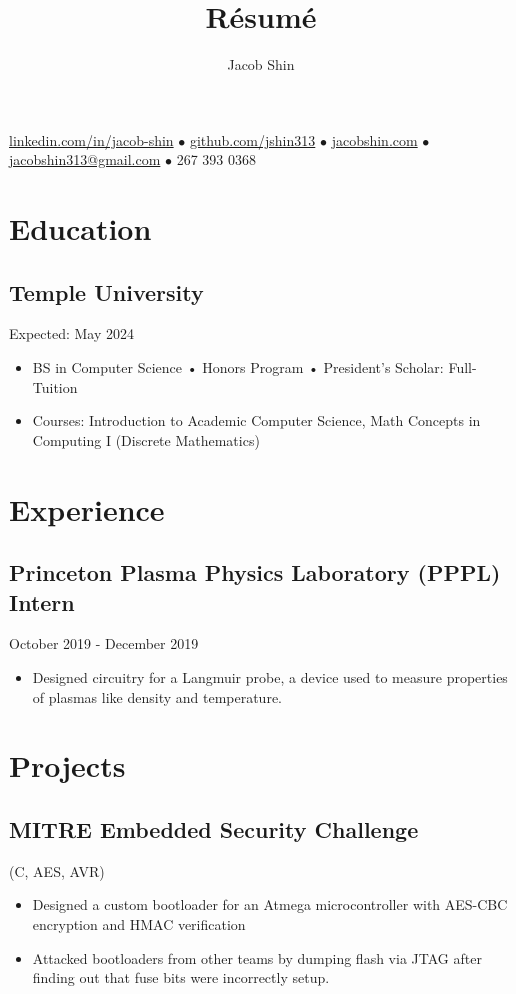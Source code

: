 \documentclass{article}
\makeatletter
\renewcommand{\maketitle}{
    \begin{center}
        {\huge\bfseries
        \theauthor}
    \end{center}
    \begin{center}
        \vspace{1em}
        \leavevmode
        \href{https://linkedin.com/in/jacob-shin}{linkedin.com/in/jacob-shin} $\bullet$ \href{https://github.com/jshin313}{github.com/jshin313} $\bullet$ \href{https://jacobshin.com}{jacobshin.com} $\bullet$ \href{jacobshin313@gmail.com}{jacobshin313@gmail.com} $\bullet$ 267 393 0368
    \end{center}
}
\makeatother
\begin{document}
\title{R\'esum\'e}
\author{Jacob Shin}

\maketitle
\section{Education}
\subsection{Temple University} \hfill Expected: May 2024
\begin{itemize}
    \item BS in Computer Science • Honors Program • President's Scholar: Full-Tuition
    \item Courses: Introduction to Academic Computer Science, Math Concepts in Computing I (Discrete Mathematics)
\end{itemize}

\section{Experience}
\subsection{Princeton Plasma Physics Laboratory (PPPL) Intern}\hfill October 2019 - December 2019
\begin{itemize}
    \item Designed circuitry for a Langmuir probe, a device used to measure properties of plasmas like density and temperature.
\end{itemize}

\section{Projects}

\subsection{MITRE Embedded Security Challenge} \hfill (C, AES, AVR)
\begin{itemize}
    \item Designed a custom bootloader for an Atmega microcontroller with AES-CBC encryption and HMAC verification
    \item Attacked bootloaders from other teams by dumping flash via JTAG after finding out that fuse bits were incorrectly setup.
\end{itemize}
\end{document}
